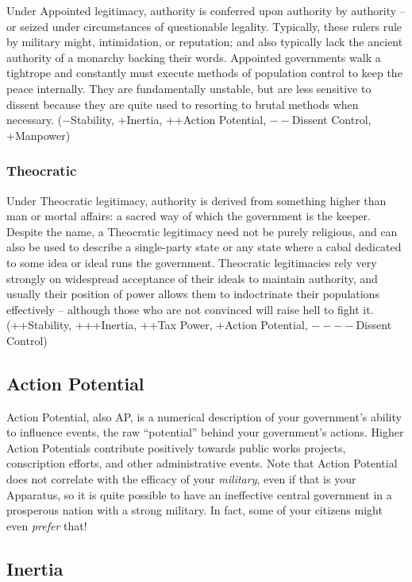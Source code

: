 \documentclass[11 pt]{scrartcl}
\begin{document}
Under Appointed legitimacy, authority is conferred upon authority by authority – or seized under circumstances of questionable legality. Typically, these rulers rule by military might, intimidation, or reputation; and also typically lack the ancient authority of a monarchy backing their words. Appointed governments walk a tightrope and constantly must execute methods of population control to keep the peace internally. They are fundamentally unstable, but are less sensitive to dissent because they are quite used to resorting to brutal methods when necessary. ($-$Stability, +Inertia, ++Action Potential, $--$Dissent Control, +Manpower)

\subsubsection*{Theocratic}

Under Theocratic legitimacy, authority is derived from something higher than man or mortal affairs: a sacred way of which the government is the keeper. Despite the name, a Theocratic legitimacy need not be purely religious, and can also be used to describe a single-party state or any state where a cabal dedicated to some idea or ideal runs the government. Theocratic legitimacies rely very strongly on widespread acceptance of their ideals to maintain authority, and usually their position of power allows them to indoctrinate their populations effectively -- although those who are not convinced will raise hell to fight it. (++Stability, +++Inertia, ++Tax Power, +Action Potential, $----$Dissent Control)

\subsection{Action Potential}

Action Potential, also AP, is a numerical description of your government's ability to influence events, the raw ``potential'' behind your government's actions. Higher Action Potentials contribute positively towards public works projects, conscription efforts, and other administrative events. Note that Action Potential does not correlate with the efficacy of your \textit{military}, even if that is your Apparatus, so it is quite possible to have an ineffective central government in a prosperous nation with a strong military. In fact, some of your citizens might even \textit{prefer} that!

\subsection{Inertia}
\end{document}
